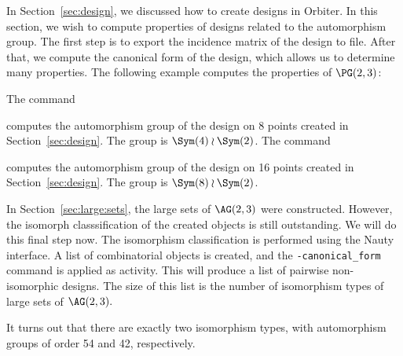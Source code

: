 In Section~\ref{sec:design}, we discussed how to create designs in Orbiter. 
In this section, we wish to compute properties of designs related to the automorphism group.
The first step is to 
export the incidence matrix of the design to file. 
After that, we compute the canonical form of the design, 
which allows us to determine many properties.
The following example computes the properties of $\PG(2,3)$:







\bigskip


The command 


computes the automorphism group of the design on 8 points created in Section~\ref{sec:design}.
The group is $\Sym(4) \wr \Sym(2)$.
The command 


computes the automorphism group of the design on 16 points created in Section~\ref{sec:design}.
The group is $\Sym(8) \wr \Sym(2)$.


\bigskip



In Section~\ref{sec:large:sets}, the large sets of $\AG(2,3)$ were constructed. 
However, the isomorph classsification of the created objects is still outstanding. 
We will do this final step now.
The isomorphism classification is performed using the Nauty interface. 
A list of combinatorial objects is created, 
and the  \verb'-canonical_form' command is applied as activity.
This will produce a list of pairwise non-isomorphic designs.
The size of this list is the number of isomorphism types of large sets of $\AG(2,3).$


It turns out that there are exactly two isomorphism types, 
with automorphism groups of order 54 and 42, respectively.

\bigskip


